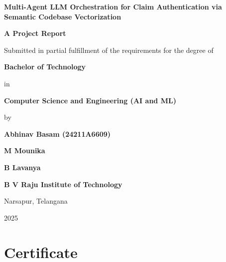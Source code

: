\documentclass[12pt,a4paper]{report}
\begin{document}
\begin{titlepage}
    \centering
    \vspace*{0.8in}
    {\fontsize{18}{22}\bfseries Multi-Agent LLM Orchestration for Claim Authentication via Semantic Codebase Vectorization\par}
    \vspace{1.2in}
    {\fontsize{14}{17}\bfseries A Project Report\par}
    \vspace{0.4in}
    {\fontsize{12}{15} Submitted in partial fulfillment of the requirements for the degree of\par}
    \vspace{0.4in}
    {\fontsize{14}{17}\bfseries Bachelor of Technology\par}
    \vspace{0.2in}
    {\fontsize{12}{15} in\par}
    \vspace{0.2in}
    {\fontsize{14}{17}\bfseries Computer Science and Engineering (AI and ML)\par}
    \vspace{0.8in}
    {\fontsize{12}{15} by\par}
    \vspace{0.4in}
    {\fontsize{14}{17}\bfseries Abhinav Basam (24211A6609)\par}
    \vspace{0.15in}
    {\fontsize{14}{17}\bfseries M Mounika\par}
    \vspace{0.15in}
    {\fontsize{14}{17}\bfseries B Lavanya\par}
    \vfill
    {\fontsize{14}{17}\bfseries B V Raju Institute of Technology\par}
    {\fontsize{12}{15} Narsapur, Telangana\par}
    \vspace{0.3in}
    {\fontsize{12}{15} 2025\par}
\end{titlepage}


\chapter*{Certificate}
\end{document}

